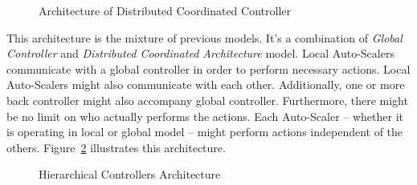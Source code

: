 \begin{description}[leftmargin=0pt]
\begin{figure}[hb]
        \caption{Architecture of Distributed Coordinated Controller}
        \label{fig:auto-scaler-dist-coord}
    \end{figure}
    \clearpage
    \item[Hierarchical Controllers] This architecture is the mixture of previous models. It's a combination of \emph{Global Controller} and \emph{Distributed Coordinated Architecture} model. Local Auto-Scalers communicate with a global controller in order to perform necessary actions. Local Auto-Scalers might also communicate with each other. Additionally, one or more back controller might also accompany global controller. Furthermore, there might be no limit on who actually performs the actions. Each Auto-Scaler -- whether it is operating in local or global model -- might perform actions independent of the others. Figure~\ref{fig:auto-scaler-hierar} illustrates this architecture.
    \begin{figure}[hb]
        \centering
        \caption{Hierarchical Controllers Architecture}
        \label{fig:auto-scaler-hierar}
    \end{figure}
\end{description}

